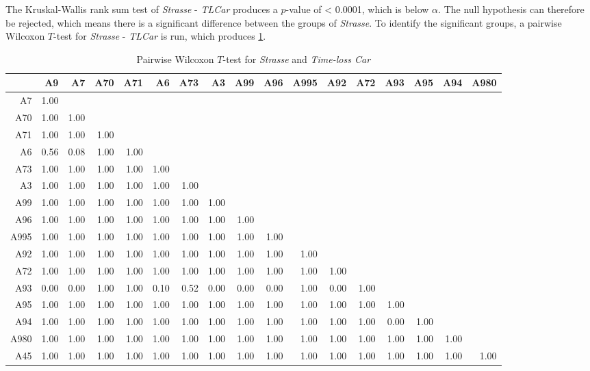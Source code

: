 The Kruskal-Wallis rank sum test of \textit{Strasse} - \textit{TLCar} produces a $p$-value of < 0.0001, which is below $\alpha$. The null hypothesis can therefore be rejected, which means there is a significant difference between the groups of \textit{Strasse}. To identify the significant groups, a pairwise Wilcoxon $T$-test for \textit{Strasse} - \textit{TLCar} is run, which produces \cref{tbl:wilcoxon_arbis_matched_Strasse_TLCar}. 
\begin{table}[ht!]
	\tiny
	\setlength{\tabcolsep}{4pt}
	\centering
  \begin{tabular}{rrrrrrrrrrrrrrrrr}
    \hline
         & A9 & A7 & A70 & A71 & A6 & A73 & A3 & A99 & A96 & A995 & A92 & A72 & A93 & A95 & A94 & A980 \\ 
    \hline
    A7   & 1.00 &  &  &  &  &  &  &  &  &  &  &  &  &  &  &  \\ 
    A70  & 1.00 & 1.00 &  &  &  &  &  &  &  &  &  &  &  &  &  &  \\ 
    A71  & 1.00 & 1.00 & 1.00 &  &  &  &  &  &  &  &  &  &  &  &  &  \\ 
    A6   & 0.56 & 0.08 & 1.00 & 1.00 &  &  &  &  &  &  &  &  &  &  &  &  \\ 
    A73  & 1.00 & 1.00 & 1.00 & 1.00 & 1.00 &  &  &  &  &  &  &  &  &  &  &  \\ 
    A3   & 1.00 & 1.00 & 1.00 & 1.00 & 1.00 & 1.00 &  &  &  &  &  &  &  &  &  &  \\ 
    A99  & 1.00 & 1.00 & 1.00 & 1.00 & 1.00 & 1.00 & 1.00 &  &  &  &  &  &  &  &  &  \\ 
    A96  & 1.00 & 1.00 & 1.00 & 1.00 & 1.00 & 1.00 & 1.00 & 1.00 &  &  &  &  &  &  &  &  \\ 
    A995 & 1.00 & 1.00 & 1.00 & 1.00 & 1.00 & 1.00 & 1.00 & 1.00 & 1.00 &  &  &  &  &  &  &  \\ 
    A92  & 1.00 & 1.00 & 1.00 & 1.00 & 1.00 & 1.00 & 1.00 & 1.00 & 1.00 & 1.00 &  &  &  &  &  &  \\ 
    A72  & 1.00 & 1.00 & 1.00 & 1.00 & 1.00 & 1.00 & 1.00 & 1.00 & 1.00 & 1.00 & 1.00 &  &  &  &  &  \\ 
    A93  & 0.00 & 0.00 & 1.00 & 1.00 & 0.10 & 0.52 & 0.00 & 0.00 & 0.00 & 1.00 & 0.00 & 1.00 &  &  &  &  \\ 
    A95  & 1.00 & 1.00 & 1.00 & 1.00 & 1.00 & 1.00 & 1.00 & 1.00 & 1.00 & 1.00 & 1.00 & 1.00 & 1.00 &  &  &  \\ 
    A94  & 1.00 & 1.00 & 1.00 & 1.00 & 1.00 & 1.00 & 1.00 & 1.00 & 1.00 & 1.00 & 1.00 & 1.00 & 0.00 & 1.00 &  &  \\ 
    A980 & 1.00 & 1.00 & 1.00 & 1.00 & 1.00 & 1.00 & 1.00 & 1.00 & 1.00 & 1.00 & 1.00 & 1.00 & 1.00 & 1.00 & 1.00 &  \\ 
    A45  & 1.00 & 1.00 & 1.00 & 1.00 & 1.00 & 1.00 & 1.00 & 1.00 & 1.00 & 1.00 & 1.00 & 1.00 & 1.00 & 1.00 & 1.00 & 1.00 \\ 
    \hline
  \end{tabular}
	\caption{Pairwise Wilcoxon $T$-test for \textit{Strasse} and \textit{Time-loss Car}}
	\label{tbl:wilcoxon_arbis_matched_Strasse_TLCar}
\end{table}
